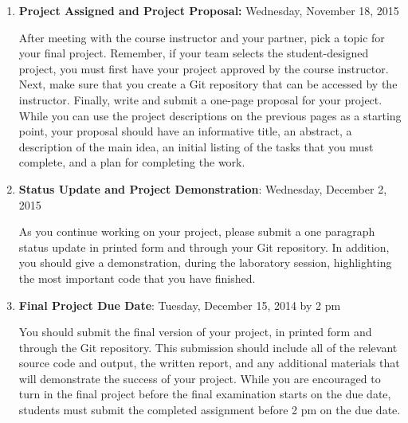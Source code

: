 \vspace*{-.05in}
\begin{enumerate}

  \itemsep0in

  \item {\bf Project Assigned and Project Proposal:} Wednesday, November 18, 2015

    After meeting with the course instructor and your partner, pick a topic for your final project.  Remember, if your
    team selects the student-designed project, you must first have your project approved by the course instructor.
    Next, make sure that you create a Git repository that can be accessed by the instructor. Finally, write and submit a
    one-page proposal for your project. While you can use the project descriptions on the previous pages as a starting
    point, your proposal should have an informative title, an abstract, a description of the main idea, an initial
    listing of the tasks that you must complete, and a plan for completing the work.

  \item {\bf Status Update and Project Demonstration}: Wednesday, December 2, 2015

    As you continue working on your project, please submit a one paragraph status update in printed form and through
    your Git repository.  In addition, you should give a demonstration, during the laboratory session, highlighting the
    most important code that you have finished.

  \item {\bf Final Project Due Date}: Tuesday, December 15, 2014 by 2 pm

    You should submit the final version of your project, in printed form and through the Git repository. This submission
    should include all of the relevant source code and output, the written report, and any additional materials that
    will demonstrate the success of your project.  While you are encouraged to turn in the final project before the
    final examination starts on the due date, students must submit the completed assignment before 2 pm on the due date.

\end{enumerate}
\vspace*{-.05in}


